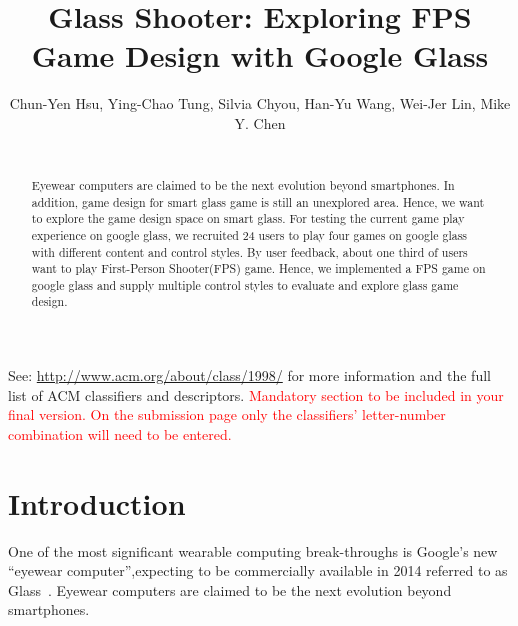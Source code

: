 \documentclass{sigchi}
\begin{document}
\title{Glass Shooter: Exploring FPS Game Design with Google Glass}

\author{\alignauthor Chun-Yen Hsu, Ying-Chao Tung, Silvia Chyou, Han-Yu Wang, Wei-Jer Lin, Mike Y. Chen \\
 \\ 
}


\maketitle



\begin{abstract}
Eyewear computers are claimed to be the next evolution beyond smartphones. In addition, game design for smart glass game is still an unexplored area. Hence, we want to explore the game design space on smart glass. For testing the current game play experience on google glass, we recruited 24 users to play four games on google glass with different content and control styles. By user feedback, about one third of users want to play First-Person Shooter(FPS) game. Hence, we implemented a FPS game on google glass and supply multiple control styles to evaluate and explore glass game design.
\end{abstract}



See: \url{http://www.acm.org/about/class/1998/}
for more information and the full list of ACM classifiers
and descriptors. 
\textcolor{red}{Mandatory section to be included in your
final version. On the submission page only the classifiers'
letter-number combination will need to be entered.}

\section{Introduction}
One of the most significant wearable computing break-throughs is Google's new ``eyewear computer'',expecting to be commercially available in 2014 referred to as Glass~\cite{glass}.
Eyewear computers are claimed to be the next evolution beyond smartphones. 
\end{document}
